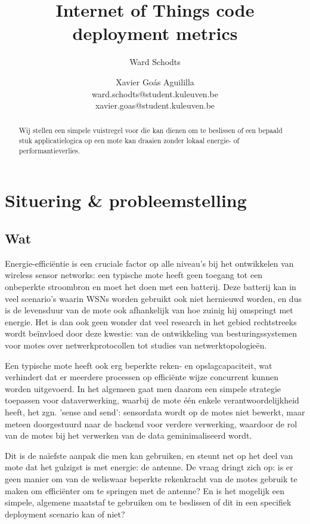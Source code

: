 \documentclass{article}
\title{Internet of Things code deployment metrics}
\author{Ward Schodts \and Xavier Go\'as Aguililla \\ ward.schodts@student.kuleuven.be \\ xavier.goas@student.kuleuven.be}
\begin{document}
\maketitle

\listoftodos

\begin{abstract}
Wij stellen een simpele vuistregel voor die kan dienen om te beslissen of een
bepaald stuk applicatielogica op een mote kan draaien zonder lokaal energie- of
performantieverlies.
  
\end{abstract}

\section{Situering \& probleemstelling}


\subsection{Wat}

Energie-effici\"entie is een cruciale factor op alle niveau's bij het
ontwikkelen van wireless sensor networks: een typische mote heeft geen toegang
tot een onbeperkte stroombron en moet het doen met een batterij. Deze batterij
kan in veel scenario's waarin WSNs worden gebruikt ook niet hernieuwd worden, en
dus is de levensduur van de mote ook afhankelijk van hoe zuinig hij omspringt
met energie. Het is dan ook geen wonder dat veel research in het gebied
rechtstreeks wordt be\"invloed door deze kwestie: van de ontwikkeling van
besturingssystemen voor motes over netwerkprotocollen tot studies van
netwerktopologie\"en.

Een typische mote heeft ook erg beperkte reken- en opslagcapaciteit, wat
verhindert dat er meerdere processen op effici\"ente wijze concurrent kunnen
worden uitgevoerd. In het algemeen gaat men daarom een simpele strategie
toepassen voor dataverwerking, waarbij de mote \'e\'en enkele
verantwoordelijkheid heeft, het zgn. 'sense and send': sensordata wordt op de
motes niet bewerkt, maar meteen doorgestuurd naar de backend voor verdere
verwerking, waardoor de rol van de motes bij het verwerken van de data
geminimaliseerd wordt.

Dit is de na\"iefste aanpak die men kan gebruiken, en steunt net op het deel van
mote dat het gulzigst is met energie: de antenne.  De vraag dringt zich op: is
er geen manier om van de weliswaar beperkte rekenkracht van de motes gebruik te
maken om effici\"enter om te springen met de antenne? En is het mogelijk een
simpele, algemene maatstaf te gebruiken om te beslissen of dit in een specifiek
deployment scenario kan of niet?
\end{document}
